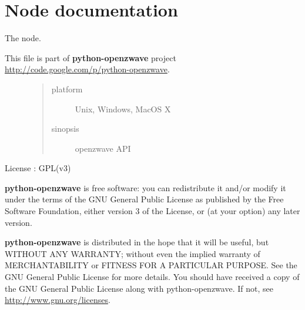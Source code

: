 \documentclass[letterpaper,10pt,english]{sphinxmanual}
\begin{document}
\section{Node documentation}
\label{node::doc}\label{node:node-documentation}
The node.
\label{node:module-openzwave.node}\label{node:module-openzwave.node}\begin{description}
\item[{This file is part of \textbf{python-openzwave} project \href{http://code.google.com/p/python-openzwave}{http://code.google.com/p/python-openzwave}.}] \leavevmode\begin{quote}\begin{description}
\item[{platform}] \leavevmode
Unix, Windows, MacOS X

\item[{sinopsis}] \leavevmode
openzwave API

\end{description}\end{quote}

\end{description}

License : GPL(v3)

\textbf{python-openzwave} is free software: you can redistribute it and/or modify
it under the terms of the GNU General Public License as published by
the Free Software Foundation, either version 3 of the License, or
(at your option) any later version.

\textbf{python-openzwave} is distributed in the hope that it will be useful,
but WITHOUT ANY WARRANTY; without even the implied warranty of
MERCHANTABILITY or FITNESS FOR A PARTICULAR PURPOSE. See the
GNU General Public License for more details.
You should have received a copy of the GNU General Public License
along with python-openzwave. If not, see \href{http://www.gnu.org/licenses}{http://www.gnu.org/licenses}.
\end{document}
